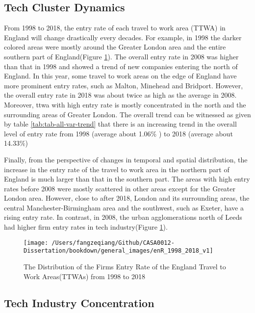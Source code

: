 \documentclass[
  12pt,
  oneside]{book}
\begin{document}
\hypertarget{tech-cluster-dynamics}{%
\subsection{Tech Cluster Dynamics}\label{tech-cluster-dynamics}}

From 1998 to 2018, the entry rate of each travel to work area (TTWA) in England will change drastically every decades. For example, in 1998 the darker colored areas were mostly around the Greater London area and the entire southern part of England(Figure \ref{fig:fig-enR-1998-2018-v1}). The overall entry rate in 2008 was higher than that in 1998 and showed a trend of new companies entering the north of England. In this year, some travel to work areas on the edge of England have more prominent entry rates, such as Malton, Minehead and Bridport. However, the overall entry rate in 2018 was about twice as high as the average in 2008. Moreover, ttwa with high entry rate is mostly concentrated in the north and the surrounding areas of Greater London. The overall trend can be witnessed as given by table \ref{tab:tab-all-var-trend} that there is an increasing trend in the overall level of entry rate from 1998 (average about 1.06\% ) to 2018
(average about 14.33\%)

Finally, from the perspective of changes in temporal and spatial distribution, the increase in the entry rate of the travel to work area in the northern part of England is much larger than that in the southern part. The areas with high entry rates before 2008 were mostly scattered in other areas except for the Greater London area. However, close to after 2018, London and its surrounding areas, the central Manchester-Birmingham area and the southwest, such as Exeter, have a rising entry rate. In contrast, in 2008, the urban agglomerations north of Leeds had higher firm entry rates in tech industry(Figure \ref{fig:fig-enR-1998-2018-v1}).

\begin{figure}
\texttt{[image: /Users/fangzeqiang/Github/CASA0012-Dissertation/bookdown/general\_images/enR\_1998\_2018\_v1]} \caption{The Distribution of the Firms Entry Rate of the England Travel to Work Areas(TTWAs) from 1998 to 2018}\label{fig:fig-enR-1998-2018-v1}
\end{figure}

\hypertarget{tech-industry-concentration}{%
\subsection{Tech Industry Concentration}\label{tech-industry-concentration}}
\end{document}
